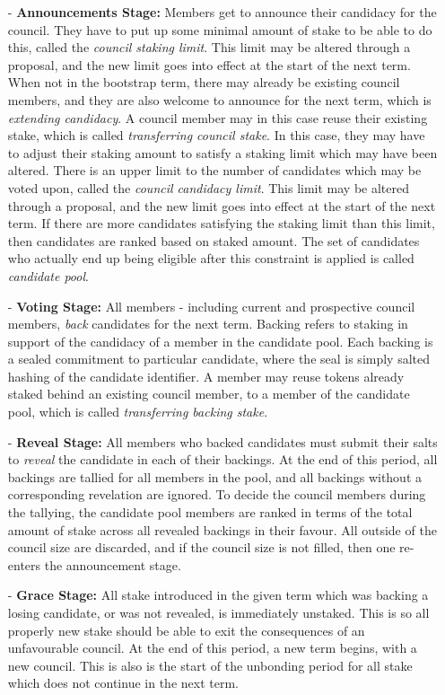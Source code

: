\documentclass{article}
\begin{document}
\begin{itemize}

\item[-] \textbf{Announcements Stage:} Members get to announce their candidacy for the council. They have to put up some minimal amount of stake to be able to do this, called the \textit{council staking limit}. This limit may be altered through a proposal, and the new limit goes into effect at the start of the next term. When not in the bootstrap term, there may already be existing council members, and they are also welcome to announce for the next term, which is \textit{extending candidacy}. A council member may in this case reuse their existing stake, which is called \textit{transferring council stake}. In this case, they may have to adjust their staking amount to satisfy a staking limit which may have been altered. There is an upper limit to the number of candidates which may be voted upon, called the \textit{council candidacy limit}. This limit may be altered through a proposal, and the new limit goes into effect at the start of the next term. If there are more candidates satisfying the staking limit than this limit, then candidates are ranked based on staked amount. The set of candidates who actually end up being eligible after this constraint is applied is called \textit{candidate pool}.

\item[-] \textbf{Voting Stage:} All members - including current and prospective council members, \textit{back} candidates for the next term. Backing refers to staking in support of the candidacy of a member in the candidate pool. Each backing is a sealed commitment to particular candidate, where the seal is simply salted hashing of the candidate identifier. A member may reuse tokens already staked behind an existing council member, to a member of the candidate pool, which is called \textit{transferring backing stake}.

\item[-] \textbf{Reveal Stage:} All members who backed candidates must submit their salts to \textit{reveal} the candidate in each of their backings. At the end of this period, all backings are tallied for all members in the pool, and all backings without a corresponding revelation are ignored. To decide the council members during the tallying, the candidate pool members are ranked in terms of the total amount of stake across all revealed backings in their favour. All outside of the council size are discarded, and if the council size is not filled, then one re-enters the announcement stage.

\item[-] \textbf{Grace Stage:} All stake introduced in the given term which was backing a losing candidate, or was not revealed, is immediately unstaked. This is so all properly new stake should be able to exit the consequences of an unfavourable council. At the end of this period, a new term begins, with a new council. This is also is the start of the unbonding period for all stake which does not continue in the next term.

\end{itemize}
\end{document}
